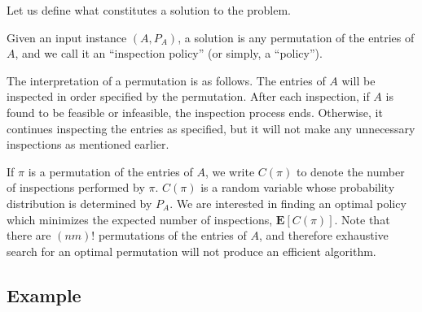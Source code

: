  Let us define what constitutes a solution to the problem. 
 \begin{definition}
 	Given an input instance $(A,P_{A})$, a solution is any permutation of the entries of $A$, and we call it an ``inspection policy'' (or simply, a ``policy'').
 \end{definition}
 The interpretation of a permutation is as follows. The entries of $A$ will be inspected in order specified by the permutation. After each inspection, if $A$ is found to be feasible or infeasible, the inspection process ends. Otherwise, it continues inspecting the entries as specified, but it will not make any unnecessary inspections as mentioned earlier. 

 If $\pi$ is a permutation of the entries of $A$, we write $C(\pi)$ to denote the number of inspections performed by $\pi$. $C(\pi)$ is a random variable whose probability distribution is determined by $P_A$. We are interested in finding an optimal policy which minimizes the expected number of inspections, $\mathbf{E}[C(\pi)]$.
 Note that there are $(nm)!$ permutations of the entries of $A$, and therefore exhaustive search for an optimal permutation will not produce an efficient algorithm. 

 \subsection{Example} \label{sec:example}

